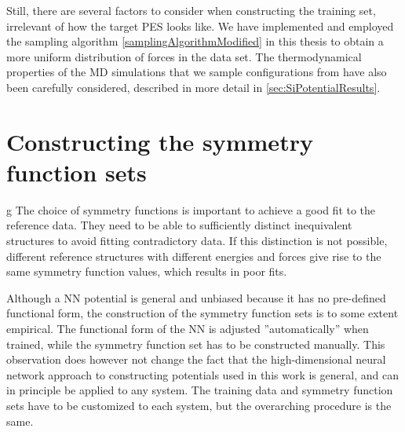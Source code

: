 \documentclass[twoside,english]{uiofysmaster}
\begin{document}
Still, there are several factors to consider when constructing the training set, irrelevant of how the target PES looks like.  
We have implemented and employed the sampling algorithm \eqref{samplingAlgorithmModified} in this thesis to obtain a more uniform
distribution of forces in the data set. The thermodynamical properties of the MD simulations that we sample configurations 
from have also been carefully considered, described in more detail in \autoref{sec:SiPotentialResults}.  



\section{Constructing the symmetry function sets} \label{sec:constructingSymmetry}g
The choice of symmetry functions is important to achieve a good fit to the reference data. 
They need to be able to sufficiently distinct inequivalent structures to avoid fitting 
contradictory data. If this distinction is not possible, different reference structures with 
different energies and forces give rise to the same symmetry function values, which results in poor fits. 

Although a NN potential is general and unbiased because it has no pre-defined functional form, the 
construction of the symmetry function sets is to some extent empirical. The functional form of the NN
is adjusted ''automatically'' when trained, while the symmetry function set has to be constructed manually.
This observation does however not change the fact that the high-dimensional neural network approach to
constructing potentials used in this work is general, and can in principle be applied to any system. The training data
and symmetry function sets have to be customized to each system, but the overarching procedure is the same. 
\end{document}
